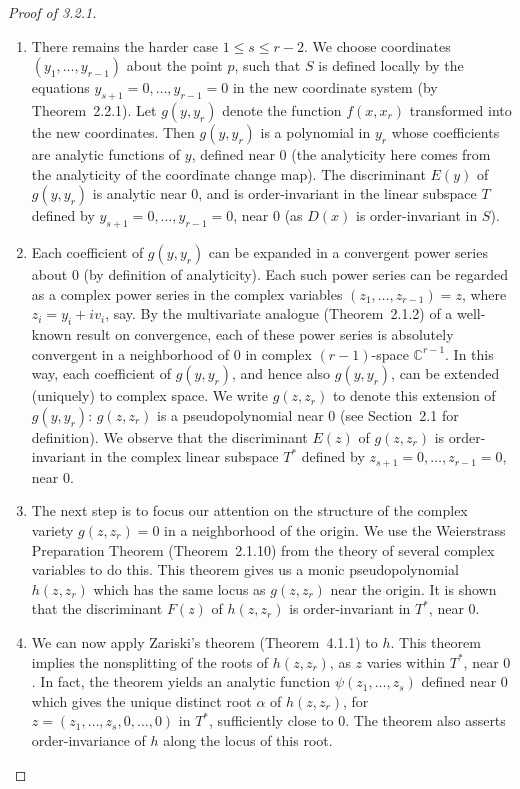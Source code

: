\documentclass[11pt]{article}
\theoremstyle{plain}
\theoremstyle{definition}
\newcommand{\C}{\mathbb{C}}
\begin{document}
\begin{proof}[Proof of 3.2.1]
\begin{enumerate}
\item There remains the harder case $1 \le s \le r-2$. We choose
coordinates $(y_1, \ldots, y_{r-1})$ about the point $p$, such that
$S$ is defined locally by the equations $y_{s+1} = 0, \ldots,
y_{r-1} = 0$ in the new coordinate system (by Theorem~2.2.1). Let
$g(y, y_r)$ denote the function $f(x, x_r)$ transformed into the new
coordinates. Then $g(y, y_r)$ is a polynomial in $y_r$ whose
coefficients are analytic functions of $y$, defined near $0$ (the
analyticity here comes from the analyticity of the coordinate change
map). The discriminant $E(y)$ of $g(y, y_r)$ is analytic near $0$, and
is order-invariant in the linear subspace $T$ defined by
$y_{s+1} = 0, \ldots, y_{r-1} = 0$, near $0$ (as $D(x)$ is
order-invariant in $S$).

\item Each coefficient of $g(y, y_r)$ can be expanded in a convergent
power series about $0$ (by definition of analyticity). Each such power
series can be regarded as a complex power series in the complex
variables $(z_1, \ldots, z_{r-1}) = z$, where $z_i = y_i + i v_i$,
say. By the multivariate analogue (Theorem~2.1.2) of a well-known
result on convergence, each of these power series is absolutely
convergent in a neighborhood of $0$ in complex $(r-1)$-space
$\C^{r-1}$. In this way, each coefficient of $g(y, y_r)$, and hence
also $g(y, y_r)$, can be extended (uniquely) to complex space. We
write $g(z, z_r)$ to denote this extension of $g(y, y_r)$:
$g(z, z_r)$ is a pseudopolynomial near $0$ (see Section~2.1 for
definition). We observe that the discriminant $E(z)$ of $g(z, z_r)$
is order-invariant in the complex linear subspace $T^*$ defined by
$z_{s+1} = 0, \ldots, z_{r-1} = 0$, near $0$.

\item The next step is to focus our attention on the structure of the
complex variety $g(z, z_r) = 0$ in a neighborhood of the origin. We use
the Weierstrass Preparation Theorem (Theorem~2.1.10) from the theory
of several complex variables to do this. This theorem gives us a monic
pseudopolynomial $h(z, z_r)$ which has the same locus as $g(z, z_r)$
near the origin. It is shown that the discriminant $F(z)$ of
$h(z, z_r)$ is order-invariant in $T^*$, near $0$.

\item We can now apply Zariski's theorem (Theorem~4.1.1) to $h$. This
theorem implies the nonsplitting of the roots of $h(z, z_r)$, as $z$
varies within $T^*$, near $0$. In fact, the theorem yields an analytic
function $\psi(z_1, \ldots, z_s)$ defined near $0$ which gives the
unique distinct root $\alpha$ of $h(z, z_r)$, for
$z = (z_1, \ldots, z_s, 0, \ldots, 0)$ in $T^*$, sufficiently close to
$0$. The theorem also asserts order-invariance of $h$ along the locus
of this root.


\end{enumerate}
\end{proof}
\end{document}
